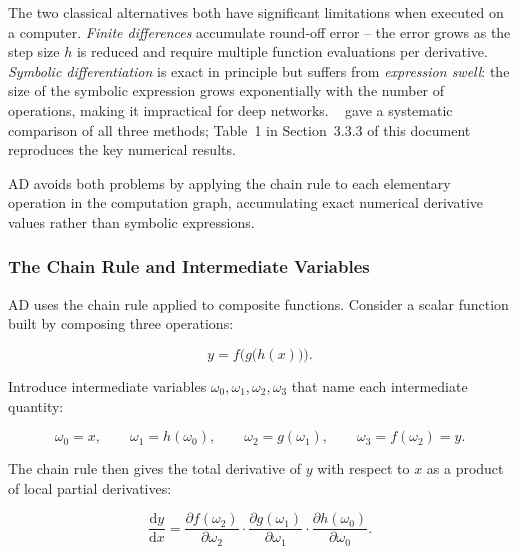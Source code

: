 \documentclass[12pt, a4paper]{article}
\begin{document}
The two classical alternatives both have significant limitations when
executed on a computer.
\emph{Finite differences} accumulate round-off error -- the error grows as the
step size $h$ is reduced and require multiple function evaluations per
derivative.
\emph{Symbolic differentiation} is exact in principle but suffers from
\emph{expression swell}: the size of the symbolic expression grows
exponentially with the number of operations, making it impractical for deep networks.
~\citep{baydin2018} gave a systematic comparison of all
three methods; Table~1 in Section~3.3.3 of this document reproduces the key
numerical results.

AD avoids both problems by applying the chain rule to each elementary
operation in the computation graph, accumulating exact numerical derivative
values rather than symbolic expressions.

\subsubsection{The Chain Rule and Intermediate Variables}

AD uses the chain rule applied to composite functions.
Consider a scalar function built by composing three operations:

\begin{equation}
  y = f\!\bigl(g\!\bigl(h(x)\bigr)\bigr).
\end{equation}

Introduce intermediate variables $\omega_0, \omega_1, \omega_2, \omega_3$
that name each intermediate quantity:

\begin{equation}
  \omega_0 = x, \qquad
  \omega_1 = h(\omega_0), \qquad
  \omega_2 = g(\omega_1), \qquad
  \omega_3 = f(\omega_2) = y.
\end{equation}

The chain rule then gives the total derivative of $y$ with respect to $x$
as a product of local partial derivatives:

\begin{equation}
  \frac{\mathrm{d}y}{\mathrm{d}x}
  = \frac{\partial f(\omega_2)}{\partial \omega_2}
    \cdot \frac{\partial g(\omega_1)}{\partial \omega_1}
    \cdot \frac{\partial h(\omega_0)}{\partial \omega_0}.
  \label{eq:ad_chain}
\end{equation}
\end{document}
